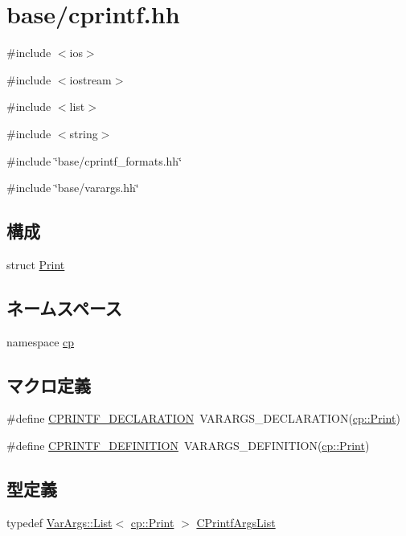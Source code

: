 \hypertarget{cprintf_8hh}{
\section{base/cprintf.hh}
\label{cprintf_8hh}
}
{\ttfamily \#include $<$ios$>$}\par
{\ttfamily \#include $<$iostream$>$}\par
{\ttfamily \#include $<$list$>$}\par
{\ttfamily \#include $<$string$>$}\par
{\ttfamily \#include \char`\"{}base/cprintf\_\-formats.hh\char`\"{}}\par
{\ttfamily \#include \char`\"{}base/varargs.hh\char`\"{}}\par
\subsection*{構成}
\begin{DoxyCompactItemize}
\item 
struct \hyperlink{structcp_1_1Print}{Print}
\end{DoxyCompactItemize}
\subsection*{ネームスペース}
\begin{DoxyCompactItemize}
\item 
namespace \hyperlink{namespacecp}{cp}
\end{DoxyCompactItemize}
\subsection*{マクロ定義}
\begin{DoxyCompactItemize}
\item 
\#define \hyperlink{cprintf_8hh_ac1f7e64b606ce2859a0eae2959180f1a}{CPRINTF\_\-DECLARATION}~VARARGS\_\-DECLARATION(\hyperlink{structcp_1_1Print}{cp::Print})
\item 
\#define \hyperlink{cprintf_8hh_a1e91b86f9dcce002fededcdbd7555ec7}{CPRINTF\_\-DEFINITION}~VARARGS\_\-DEFINITION(\hyperlink{structcp_1_1Print}{cp::Print})
\end{DoxyCompactItemize}
\subsection*{型定義}
\begin{DoxyCompactItemize}
\item 
typedef \hyperlink{classVarArgs_1_1List}{VarArgs::List}$<$ \hyperlink{structcp_1_1Print}{cp::Print} $>$ \hyperlink{cprintf_8hh_a172a676df3b19060341a2bf04a85d39f}{CPrintfArgsList}
\end{DoxyCompactItemize}
